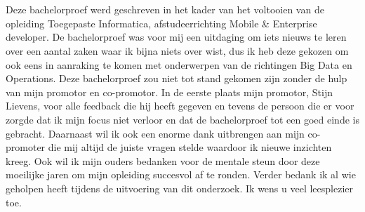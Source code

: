 
\chapter*{}%
\label{ch:voorwoord}

Deze bachelorproef werd geschreven in het kader van het voltooien van de opleiding Toegepaste Informatica, afstudeerrichting Mobile \& Enterprise developer.
De bachelorproef was voor mij een uitdaging om iets nieuws te leren over een aantal zaken waar ik bijna niets over wist, dus ik heb deze gekozen om ook eens in aanraking te komen met onderwerpen van de richtingen Big Data en Operations.
Deze bachelorproef zou niet tot stand gekomen zijn zonder de hulp van mijn promotor en co-promotor.
In de eerste plaats mijn promotor, Stijn Lievens, voor alle feedback die hij heeft gegeven en tevens de persoon die er voor zorgde dat ik mijn focus niet verloor en dat de bachelorproef tot een goed einde is gebracht.
Daarnaast wil ik ook een enorme dank uitbrengen aan mijn co-promoter die mij altijd de juiste vragen stelde waardoor ik nieuwe inzichten kreeg. Ook wil ik mijn ouders bedanken voor de mentale steun door deze moeilijke jaren om mijn opleiding succesvol af te ronden.
Verder bedank ik al wie geholpen heeft tijdens de uitvoering van dit onderzoek.
\newline
Ik wens u veel leesplezier toe.